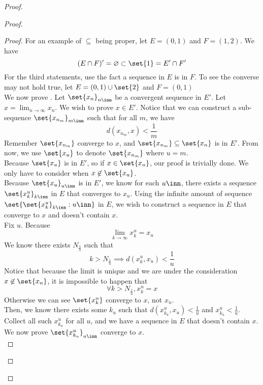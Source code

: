 \documentclass{report}
\begin{document}
\begin{proof}
\begin{proof}
\begin{proof}
For an example of $\subseteq$ being proper, let $E=(0,1)$ and $F=(1,2)$. We have 
\begin{equation*}
  (E\cap F)'=\varnothing \subset \set{1}=E'\cap F'
\end{equation*}
For the third statements, use the fact a sequence in $E$ is in $F$. To see the converse may not hold true, let $E=(0,1)\cup \set{2}$ and $F=(0,1)$\\

We now prove . Let $\set{x_n}_{n\inn}$ be a convergent sequence in $E'$. Let $x=\lim_{n\to\infty} x_n$. We wish to prove $x\in E'$. Notice that we can construct a sub-sequence $\set{x_{n_m}}_{m \inn}$ such that for all $m$, we have 
 \begin{equation*}
d(x_{n_m},x)<\frac{1}{m}
\end{equation*}
Remember $\set{x_{n_m}}$ converge to $x$, and $\set{x_{n_m}}\subseteq \set{x_n}$ is in $E'$. From now, we use $\set{x_u}$ to denote $\set{x_{n_m}}$ where $u=m$.\\ 

Because $\set{x_u}$ is in $E'$, so if  $x\in \set{x_u}$, our proof is trivially done. We only have to consider when $x\not\in \set{x_u}$.\\

Because $\set{x_u}_{u\inn}$ is in $E'$, we know for each  $u\inn$, there exists a sequence  $\set{x^u_k}_{k\inn}$ in $E$ that converges to $x_u$. Using the infinite amount of sequence $\set{\set{x^u_k}_{k\inn}:u\inn}$ in $E$, we wish to construct a sequence in $E$ that converge to  $x$ and doesn't contain  $x$.\\

Fix $u$. Because 
\begin{equation*}
\lim_{k\to\infty} x_k^u=x_u
\end{equation*}
We know there exists $N_{\frac{1}{u}}$ such that
\begin{equation*}
k>N_{\frac{1}{u}}\implies d(x_k^u,x_u)<\frac{1}{u}
\end{equation*}
Notice that because the limit is unique and we are under the consideration $x\not\in \set{x_n}$, it is impossible to happen that 
\begin{equation*}
\forall k>N_{\frac{1}{u}}, x_k^u=x
\end{equation*}
Otherwise we can see $\set{x^n_k}$ converge to $x$, not  $x_n$.\\

Then, we know there exists some  $k_u$ such that  $d(x_{k_u}^u,x_u)<\frac{1}{u}$ and $x_{k_u}^u<\frac{1}{u}$. Collect all such $x^u_{k_u}$ for all $u$, and we have a sequence in  $E$ that doesn't contain $x$. We now prove $\set{x^u_{k_u}}_{u\inn}$ converge to $x$.\\


\end{proof}
\end{proof}
\end{proof}
\end{document}
